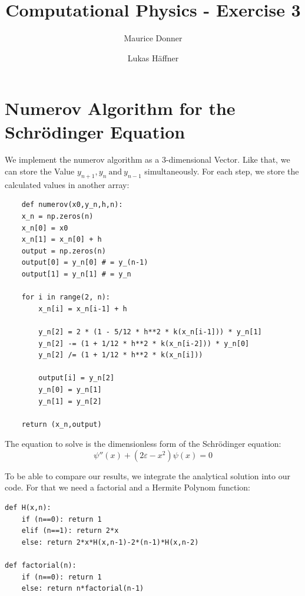 \documentclass{article}
\title{Computational Physics - Exercise 3}
\author{Maurice Donner \and Lukas Häffner}
\begin{document}
\maketitle
\newpage

\section{Numerov Algorithm for the Schrödinger Equation}

We implement the numerov algorithm as a 3-dimensional Vector. Like that,
we can store the Value \( y _{n+1} , y _{n} \ \text{and} \ y _{n-1} \) 
simultaneously. For each step, we store the calculated values in another array:

\begin{lstlisting}
    def numerov(x0,y_n,h,n):
    x_n = np.zeros(n)
    x_n[0] = x0
    x_n[1] = x_n[0] + h
    output = np.zeros(n)
    output[0] = y_n[0] # = y_(n-1)
    output[1] = y_n[1] # = y_n
    
    for i in range(2, n):
        x_n[i] = x_n[i-1] + h

        y_n[2] = 2 * (1 - 5/12 * h**2 * k(x_n[i-1])) * y_n[1] 
        y_n[2] -= (1 + 1/12 * h**2 * k(x_n[i-2])) * y_n[0]
        y_n[2] /= (1 + 1/12 * h**2 * k(x_n[i]))

        output[i] = y_n[2]
        y_n[0] = y_n[1]
        y_n[1] = y_n[2]

    return (x_n,output)
\end{lstlisting}

The equation to solve is the dimensionless form of the Schrödinger equation:
\[ 
    \psi ''(x) + (2 \varepsilon - x ^{2} ) \psi (x) = 0
\]

To be able to compare our results, we integrate the analytical solution into our
code. For that we need a factorial and a Hermite Polynom function:
\begin{lstlisting}
def H(x,n):
    if (n==0): return 1
    elif (n==1): return 2*x
    else: return 2*x*H(x,n-1)-2*(n-1)*H(x,n-2)

def factorial(n):
    if (n==0): return 1
    else: return n*factorial(n-1)
\end{lstlisting}
\end{document}
